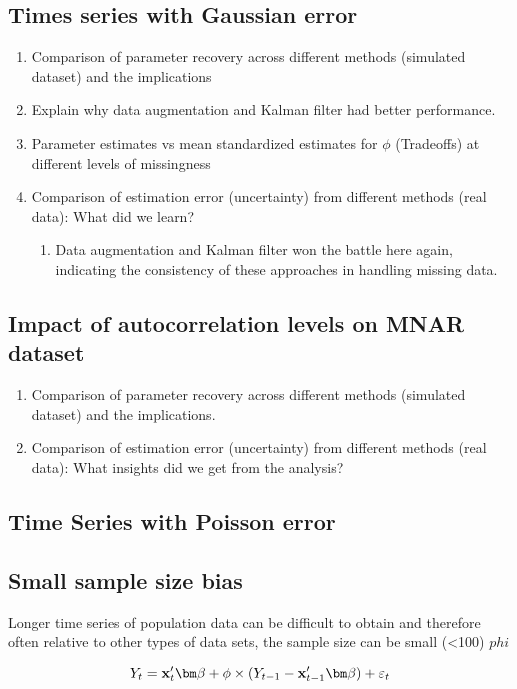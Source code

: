 \subsection*{Times series with Gaussian error} 
\begin{enumerate}
    \item Comparison of parameter recovery across different methods (simulated dataset) and the implications 
        \item Explain why data augmentation and Kalman filter had better performance. 
        \item Parameter estimates vs mean standardized estimates for $\phi$ (Tradeoffs) at different levels of missingness
    \item Comparison of estimation error (uncertainty) from different methods (real data): What did we learn?
    \begin{enumerate}
        \item Data augmentation and Kalman filter won the battle here again, indicating the consistency of these approaches in handling missing data. 
    \end{enumerate}
\end{enumerate}
\subsection*{Impact of autocorrelation levels on MNAR dataset}
\begin{enumerate}
    \item Comparison of parameter recovery across different methods (simulated dataset) and the implications.
    \item Comparison of estimation error (uncertainty) from different methods (real data): What insights did we get from the analysis?
    \end{enumerate}

\subsection*{Time Series with Poisson error}



\subsection*{Small sample size bias}
Longer time series of population data can be difficult to obtain and therefore often relative to other types of data sets, the sample size can be small (<100)
$phi$ 

\begin{equation}
    Y_t = {\bf x}_t'{\bm \beta} + \phi \times (Y_{t-1} - {\bf x}_{t-1}'{\bm \beta}) + \varepsilon_t
\label{eq:ar1}
\end{equation}
